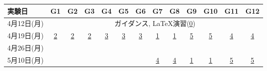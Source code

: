\documentclass[12pt]{jarticle}
\begin{document}
\begin{table}[htb]
    \begin{center}
        \begin{tabular}{|l||c|c|c|c|c|c||c|c|c|c|c|c|}
            \hline
            実験日      & G1                                                           & G2                               & G3                               & G4                               & G5                               & G6                               & G7                               & G8                               & G9                               & G10                              & G11                              & G12                              \\ \hline \hline
            4月12日(月) & \multicolumn{12}{c|}{ガイダンス, \LaTeX 演習(\underline{0})}                                                                                                                                                                                                                                                                                                                                                                                                  \\ \hline \hline
            4月19日(月) & \multirow{3}{*}{{\underline{2}}}                             & \multirow{3}{*}{{\underline{2}}} & \multirow{3}{*}{{\underline{2}}} & \multirow{3}{*}{{\underline{3}}} & \multirow{3}{*}{{\underline{3}}} & \multirow{3}{*}{{\underline{3}}} & \multirow{2}{*}{{\underline{1}}} & \multirow{2}{*}{{\underline{1}}} & \multirow{2}{*}{{\underline{5}}} & \multirow{2}{*}{{\underline{5}}} & \multirow{2}{*}{{\underline{4}}} & \multirow{2}{*}{{\underline{4}}} \\
            4月26日(月) &                                                              &                                  &                                  &                                  &                                  &                                  &                                  &                                  &                                  &                                  &                                  &                                  \\ \cline{8-13}
            5月10日(月) &                                                              &                                  &                                  &                                  &                                  &                                  & \multirow{2}{*}{{\underline{4}}} & \multirow{2}{*}{{\underline{4}}} & \multirow{2}{*}{{\underline{1}}} & \multirow{2}{*}{{\underline{1}}} & \multirow{2}{*}{{\underline{5}}} & \multirow{2}{*}{{\underline{5}}} \\ \cline{2-7}

\end{tabular}
\end{center}
\end{table}
\end{document}
